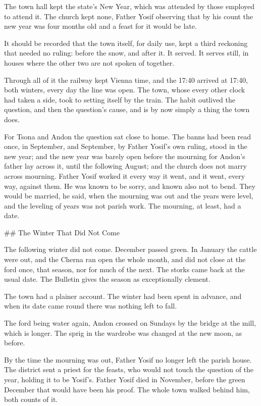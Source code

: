 \documentclass[11pt]{article}
\begin{document}
The town hall kept the state's New Year, which was attended by those employed to attend it. The church kept none, Father Yosif observing that by his count the new year was four months old and a feast for it would be late.

It should be recorded that the town itself, for daily use, kept a third reckoning that needed no ruling: before the snow, and after it. It served. It serves still, in houses where the other two are not spoken of together.

Through all of it the railway kept Vienna time, and the 17:40 arrived at 17:40, both winters, every day the line was open. The town, whose every other clock had taken a side, took to setting itself by the train. The habit outlived the question, and then the question's cause, and is by now simply a thing the town does.

For Tsona and Andon the question sat close to home. The banns had been read once, in September, and September, by Father Yosif's own ruling, stood in the new year; and the new year was barely open before the mourning for Andon's father lay across it, until the following August; and the church does not marry across mourning. Father Yosif worked it every way it went, and it went, every way, against them. He was known to be sorry, and known also not to bend. They would be married, he said, when the mourning was out and the years were level, and the leveling of years was not parish work. The mourning, at least, had a date.

\#\# The Winter That Did Not Come

The following winter did not come. December passed green. In January the cattle were out, and the Cherna ran open the whole month, and did not close at the ford once, that season, nor for much of the next. The storks came back at the usual date. The Bulletin gives the season as exceptionally clement.

The town had a plainer account. The winter had been spent in advance, and when its date came round there was nothing left to fall.

The ford being water again, Andon crossed on Sundays by the bridge at the mill, which is longer. The sprig in the wardrobe was changed at the new moon, as before.

By the time the mourning was out, Father Yosif no longer left the parish house. The district sent a priest for the feasts, who would not touch the question of the year, holding it to be Yosif's. Father Yosif died in November, before the green December that would have been his proof. The whole town walked behind him, both counts of it.
\end{document}
